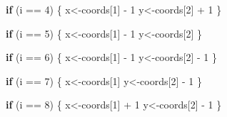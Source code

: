 \documentclass[]{tufte-book}
\newenvironment{Shaded}{}{}
\newcommand{\ControlFlowTok}[1]{\textcolor[rgb]{0.00,0.44,0.13}{\textbf{#1}}}
\newcommand{\DecValTok}[1]{\textcolor[rgb]{0.25,0.63,0.44}{#1}}
\newcommand{\NormalTok}[1]{#1}
\newcommand{\OtherTok}[1]{\textcolor[rgb]{0.00,0.44,0.13}{#1}}
\newcommand{\SpecialCharTok}[1]{\textcolor[rgb]{0.25,0.44,0.63}{#1}}
\begin{document}
\begin{Shaded}
\begin{Highlighting}[]
                \ControlFlowTok{if}\NormalTok{ (i }\SpecialCharTok{==} \DecValTok{4}\NormalTok{) \{}
\NormalTok{                        x}\OtherTok{\textless{}{-}}\NormalTok{coords[}\DecValTok{1}\NormalTok{] }\SpecialCharTok{{-}} \DecValTok{1}
\NormalTok{                        y}\OtherTok{\textless{}{-}}\NormalTok{coords[}\DecValTok{2}\NormalTok{] }\SpecialCharTok{+} \DecValTok{1}
\NormalTok{                \}}
                
                \ControlFlowTok{if}\NormalTok{ (i }\SpecialCharTok{==} \DecValTok{5}\NormalTok{) \{}
\NormalTok{                        x}\OtherTok{\textless{}{-}}\NormalTok{coords[}\DecValTok{1}\NormalTok{] }\SpecialCharTok{{-}} \DecValTok{1}
\NormalTok{                        y}\OtherTok{\textless{}{-}}\NormalTok{coords[}\DecValTok{2}\NormalTok{]}
\NormalTok{                \}}
                
                \ControlFlowTok{if}\NormalTok{ (i }\SpecialCharTok{==} \DecValTok{6}\NormalTok{) \{}
\NormalTok{                        x}\OtherTok{\textless{}{-}}\NormalTok{coords[}\DecValTok{1}\NormalTok{] }\SpecialCharTok{{-}} \DecValTok{1}
\NormalTok{                        y}\OtherTok{\textless{}{-}}\NormalTok{coords[}\DecValTok{2}\NormalTok{] }\SpecialCharTok{{-}} \DecValTok{1}
\NormalTok{                \}}
                
                \ControlFlowTok{if}\NormalTok{ (i }\SpecialCharTok{==} \DecValTok{7}\NormalTok{) \{}
\NormalTok{                        x}\OtherTok{\textless{}{-}}\NormalTok{coords[}\DecValTok{1}\NormalTok{]}
\NormalTok{                        y}\OtherTok{\textless{}{-}}\NormalTok{coords[}\DecValTok{2}\NormalTok{] }\SpecialCharTok{{-}} \DecValTok{1}
\NormalTok{                \}}
                
                \ControlFlowTok{if}\NormalTok{ (i }\SpecialCharTok{==} \DecValTok{8}\NormalTok{) \{}
\NormalTok{                        x}\OtherTok{\textless{}{-}}\NormalTok{coords[}\DecValTok{1}\NormalTok{] }\SpecialCharTok{+} \DecValTok{1}
\NormalTok{                        y}\OtherTok{\textless{}{-}}\NormalTok{coords[}\DecValTok{2}\NormalTok{] }\SpecialCharTok{{-}} \DecValTok{1}
\NormalTok{                \}}
                

\end{Highlighting}
\end{Shaded}
\end{document}

